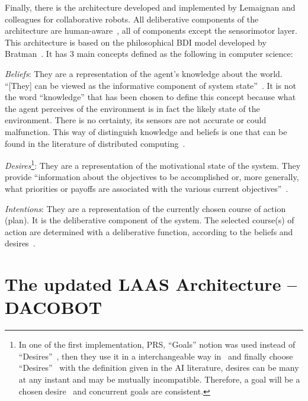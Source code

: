\documentclass[a4paper,11pt,twoside]{StyleThese}
\begin{document}
Finally, there is the architecture developed and implemented by Lemaignan and colleagues for collaborative robots. All deliberative components of the architecture are human-aware~\cite{lemaignan_2017_artificial}, \ie all of components except the sensorimotor layer. This architecture is based on the philosophical BDI model developed by Bratman~\cite{bratman_1987_intention,bratman_1988_plans}. It has 3 main concepts defined as the following in computer science:
\begin{bulletList}
	\item \emph{Beliefs}: They are a representation of the agent’s knowledge about the world. ``[They] can be viewed as the informative component of system state''~\cite[p.~313]{rao_1995_bdi}. It is not the word ``knowledge'' that has been chosen to define this concept because what the agent perceives of the environment is in fact the likely state of the environment. There is no certainty, its sensors are not accurate or could malfunction. This way of distinguish knowledge and beliefs is one that can be found in the literature of distributed computing~\cite{lamarre_1994_knowledge}.
	\item \emph{Desires}\footnote{In one of the first implementation, PRS, ``Goals'' notion was used instead of ``Desires''~\cite{georgeff_1989_decision}, then they use it in a interchangeable way in~\cite{georgeff_1991_modeling} and finally choose ``Desires''~\cite{rao_1995_bdi} with the definition given in the AI literature, \eg desires can be many at any instant and may be mutually incompatible. Therefore, a goal will be a chosen desire~\cite{cohen_1990_intention} and concurrent goals are consistent.}: They are a representation of the motivational state of the system. They provide ``information about the objectives to be accomplished or, more generally, what priorities or payoffs are associated with the various current objectives''~\cite{rao_1995_bdi}. 
	\item \emph{Intentions}: They are a representation of the currently chosen course of action (plan). It is the deliberative component of the system. The selected course(s) of action are determined with a deliberative function, according to the beliefs and desires~\cite{rao_1995_bdi}.
\end{bulletList}



\section{The updated LAAS Architecture -- DACOBOT}\label{chap3:sec:rob_archi}
\end{document}
